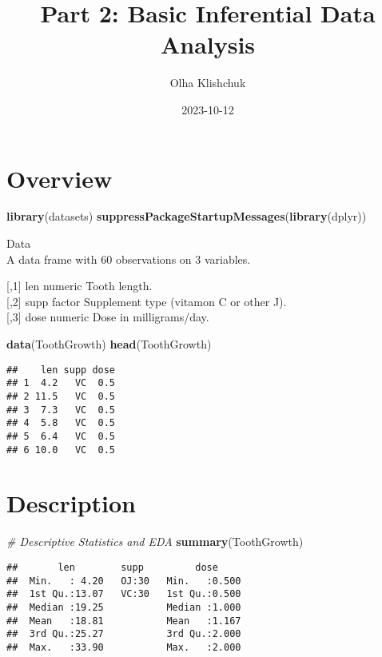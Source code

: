 \documentclass[
]{article}
\title{Part 2: Basic Inferential Data Analysis}
\author{Olha Klishchuk}
\date{2023-10-12}
\newenvironment{Shaded}{\begin{snugshade}}{\end{snugshade}}
\newcommand{\CommentTok}[1]{\textcolor[rgb]{0.56,0.35,0.01}{\textit{#1}}}
\newcommand{\FunctionTok}[1]{\textcolor[rgb]{0.13,0.29,0.53}{\textbf{#1}}}
\newcommand{\NormalTok}[1]{#1}
\begin{document}
\maketitle

\section{Overview}\label{overview}

\begin{Shaded}
\begin{Highlighting}[]
\FunctionTok{library}\NormalTok{(datasets)}
\FunctionTok{suppressPackageStartupMessages}\NormalTok{(}\FunctionTok{library}\NormalTok{(dplyr))}
\end{Highlighting}
\end{Shaded}

Data\\
A data frame with 60 observations on 3 variables.

{[},1{]} len numeric Tooth length.\\
{[},2{]} supp factor Supplement type (vitamon C or other J).\\
{[},3{]} dose numeric Dose in milligrams/day.

\begin{Shaded}
\begin{Highlighting}[]
\FunctionTok{data}\NormalTok{(ToothGrowth)}
\FunctionTok{head}\NormalTok{(ToothGrowth)}
\end{Highlighting}
\end{Shaded}

\begin{verbatim}
##    len supp dose
## 1  4.2   VC  0.5
## 2 11.5   VC  0.5
## 3  7.3   VC  0.5
## 4  5.8   VC  0.5
## 5  6.4   VC  0.5
## 6 10.0   VC  0.5
\end{verbatim}

\section{Description}\label{description}

\begin{Shaded}
\begin{Highlighting}[]
\CommentTok{\# Descriptive Statistics and EDA}
\FunctionTok{summary}\NormalTok{(ToothGrowth)}
\end{Highlighting}
\end{Shaded}

\begin{verbatim}
##       len        supp         dose      
##  Min.   : 4.20   OJ:30   Min.   :0.500  
##  1st Qu.:13.07   VC:30   1st Qu.:0.500  
##  Median :19.25           Median :1.000  
##  Mean   :18.81           Mean   :1.167  
##  3rd Qu.:25.27           3rd Qu.:2.000  
##  Max.   :33.90           Max.   :2.000
\end{verbatim}
\end{document}
